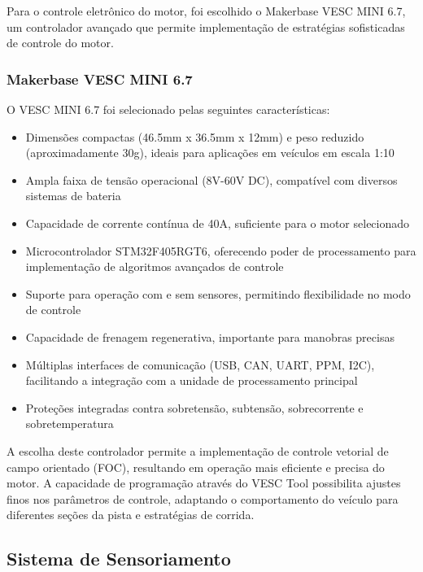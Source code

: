Para o controle eletrônico do motor, foi escolhido o Makerbase VESC MINI 6.7,
um controlador avançado que permite implementação de estratégias sofisticadas
de controle do motor.

\subsubsection{Makerbase VESC MINI 6.7}

O VESC MINI 6.7 foi selecionado pelas seguintes características:

\begin{itemize}
    \item Dimensões compactas (46.5mm x 36.5mm x 12mm) e peso reduzido (aproximadamente
          30g), ideais para aplicações em veículos em escala 1:10
    \item Ampla faixa de tensão operacional (8V-60V DC), compatível com diversos sistemas
          de bateria
    \item Capacidade de corrente contínua de 40A, suficiente para o motor selecionado
    \item Microcontrolador STM32F405RGT6, oferecendo poder de processamento para
          implementação de algoritmos avançados de controle
    \item Suporte para operação com e sem sensores, permitindo flexibilidade no modo de
          controle
    \item Capacidade de frenagem regenerativa, importante para manobras precisas
    \item Múltiplas interfaces de comunicação (USB, CAN, UART, PPM, I2C), facilitando a
          integração com a unidade de processamento principal
    \item Proteções integradas contra sobretensão, subtensão, sobrecorrente e
          sobretemperatura
\end{itemize}

A escolha deste controlador permite a implementação de controle vetorial de
campo orientado (FOC), resultando em operação mais eficiente e precisa do
motor. A capacidade de programação através do VESC Tool possibilita ajustes
finos nos parâmetros de controle, adaptando o comportamento do veículo para
diferentes seções da pista e estratégias de corrida.

\subsection{Sistema de Sensoriamento}

